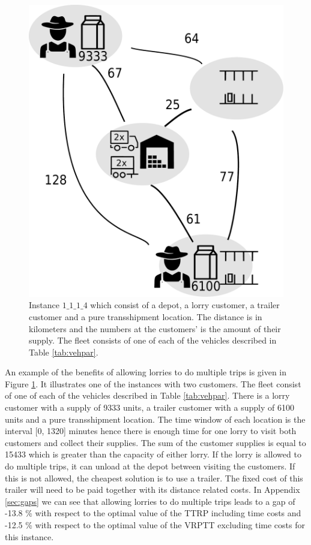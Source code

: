 \begin{figure}[!ht]
  \centering
    \includegraphics[width=.8\textwidth]{img/1_1_1_4.pdf}
  \caption{Instance $1\_1\_1\_4$ which consist of a depot, a lorry customer, a trailer customer and a pure transshipment location. The distance is in kilometers and the numbers at the customers' is the amount of their supply. The fleet consists of one of each of the vehicles described in Table \ref{tab:vehpar}. }
  \label{fig:instance}
\end{figure}

An example of the benefits of allowing lorries to do multiple trips is given in Figure  \ref{fig:instance}. It illustrates one of the instances with two customers. The fleet consist of one of each of the vehicles described in Table \ref{tab:vehpar}. There is a lorry customer with a supply of 9333 units, a trailer customer with a supply of 6100 units and a pure transshipment location. The time window of each location is the interval [0, 1320] minutes hence there is enough time for one lorry to visit both customers and collect their supplies.
The sum of the customer supplies is equal to 15433 which is greater than the capacity of either lorry.
If the lorry is allowed to do multiple trips, it can unload at the depot between visiting the customers.
If this is not allowed, the cheapest solution is to use a trailer.
The fixed cost of this trailer will need to be paid together with its distance related costs.
In Appendix \ref{sec:gaps} we can see that allowing lorries to do multiple trips leads to a gap of -13.8 \% with respect to the optimal value of the TTRP including time costs and -12.5 \% with respect to the optimal value of the VRPTT excluding time costs for this instance.

